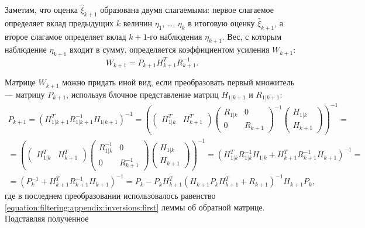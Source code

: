 Заметим, что оценка $\widehat{\xi}_{k+1}$ образована двумя слагаемыми: первое слагаемое определяет вклад предыдущих $k$ величин $\eta_1$, \dots, $\eta_k$ в итоговую
оценку $\widehat{\xi}_{k+1}$, а второе слагамое определяет вклад $k+1$-го наблюдения $\eta_{k+1}$. Вес, с которым наблюдение $\eta_{k+1}$ входит в сумму,
определяется коэффициентом усиления $W_{k+1}$:
\begin{equation} \label{equation:filtering:in_observations:dynamic:iterative:preliminary_gain}
	W_{k+1} = P_{k+1} H_{k+1}^T R_{k+1}^{-1} .
\end{equation}

Матрице $W_{k+1}$ можно придать иной вид, если преобразовать первый множитель --- матрицу $P_{k+1}$, используя блочное представление матриц $H_{1|k+1}$ и $R_{1|k+1}$:
\begin{multline} \label{equation:filtering:in_observations:dynamic:iterative:preliminary_next_estimate_covariance}
	P_{k+1} = \left ( H_{1|k+1}^T R_{1|k+1}^{-1} H_{1|k+1} \right )^{-1}
	=
		\left (
			\begin{pmatrix}
				H_{1|k}^T & H_{k+1}^T
			\end{pmatrix}
			\begin{pmatrix}
				R_{1|k} & 0 \\
				0       & R_{k+1}
			\end{pmatrix}^{-1}
			\begin{pmatrix}
				H_{1|k} \\
				H_{k+1}
			\end{pmatrix}
		\right )^{-1} = \\
	=
		\left (
			\begin{pmatrix}
				H_{1|k}^T & H_{k+1}^T
			\end{pmatrix}
			\begin{pmatrix}
				R_{1|k}^{-1} & 0 \\
				0            & R_{k+1}^{-1}
			\end{pmatrix}
			\begin{pmatrix}
				H_{1|k} \\
				H_{k+1}
			\end{pmatrix}
		\right )^{-1}
	= \left ( H_{1|k}^T R_{1|k}^{-1} H_{1|k} + H_{k+1}^T R_{k+1}^{-1} H_{k+1} \right )^{-1} = \\
	= \left ( P_k^{-1} + H_{k+1}^T R_{k+1}^{-1} H_{k+1} \right )^{-1}
	= P_k - P_k H_{k+1}^T \left ( H_{k+1} P_k H_{k+1}^T + R_{k+1} \right )^{-1} H_{k+1} P_k
	,
\end{multline}
где в последнем преобразовании использовалось равенство \eqref{equation:filtering:appendix:inversions:first} леммы об обратной матрице. Подставляя полученное
